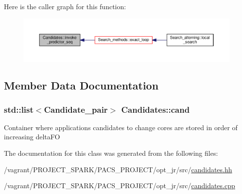 Here is the caller graph for this function\-:
\nopagebreak
\begin{figure}[H]
\begin{center}
\leavevmode
\includegraphics[width=350pt]{classCandidates_a0f5bfe459063108d80ed8dce02c6c07b_icgraph}
\end{center}
\end{figure}




\subsection{Member Data Documentation}
\hypertarget{classCandidates_a45b43ae5f71d2162f591e4019f1bc560}{
\subsubsection[{cand}]{\setlength{\rightskip}{0pt plus 5cm}std\-::list$<${\bf Candidate\-\_\-pair}$>$ Candidates\-::cand\hspace{0.3cm}{\ttfamily [private]}}}\label{classCandidates_a45b43ae5f71d2162f591e4019f1bc560}
Container where applications candidates to change cores are stored in order of increasing delta\-F\-O 

The documentation for this class was generated from the following files\-:\begin{DoxyCompactItemize}
\item 
/vagrant/\-P\-R\-O\-J\-E\-C\-T\-\_\-\-S\-P\-A\-R\-K/\-P\-A\-C\-S\-\_\-\-P\-R\-O\-J\-E\-C\-T/opt\-\_\-jr/src/\hyperlink{candidates_8hh}{candidates.\-hh}\item 
/vagrant/\-P\-R\-O\-J\-E\-C\-T\-\_\-\-S\-P\-A\-R\-K/\-P\-A\-C\-S\-\_\-\-P\-R\-O\-J\-E\-C\-T/opt\-\_\-jr/src/\hyperlink{candidates_8cpp}{candidates.\-cpp}\end{DoxyCompactItemize}
